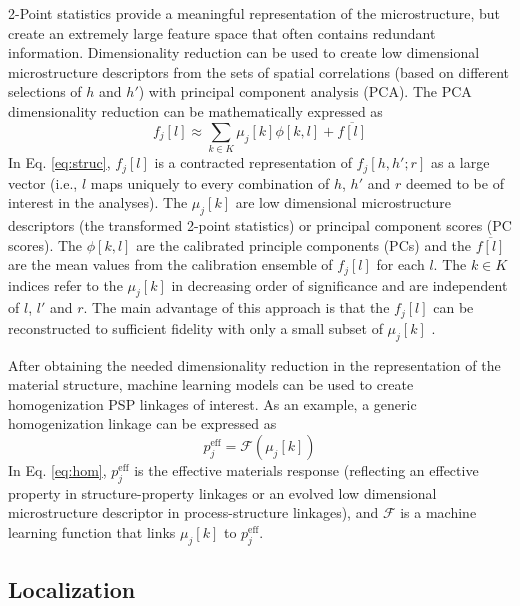 \documentclass{bmcart}
\begin{document}
2-Point statistics provide a meaningful representation of the
microstructure, but create an extremely large feature space that often
contains redundant information. Dimensionality reduction can be used
to create low dimensional microstructure descriptors from the sets of
spatial correlations (based on different selections of $h$ and $h'$)
with principal component analysis (PCA). The PCA dimensionality
reduction can be mathematically expressed as
\begin{equation} \label{eq:struc}
    f_j\left[l\right] \approx \sum_{k\in K} \mu_j\left[k\right]
    \phi\left[k,l\right] + \overline{f[l]}
\end{equation}
In Eq. \ref{eq:struc}, $f_j\left[l\right]$ is a contracted representation of 
$f_j\left[h, h'; r\right]$ %
as a large vector (i.e., $l$ maps uniquely to every combination
of $h$, $h'$ and $r$ deemed to be of interest in the analyses). The $\mu_j[k]$ are low dimensional microstructure
descriptors (the transformed 2-point statistics) or principal component
scores (PC scores). The $\phi\left[k, l\right]$ are the calibrated
principle components (PCs) and the $\overline{f[l]}$ are the mean
values  from the calibration ensemble of $f_j\left[l\right]$ for each
$l$. The $k \in K$ indices refer to the $\mu_j\left[k\right]$ in
decreasing order of significance and are independent of $l$, $l'$ and
$r$. The main advantage of this approach is that the
$f_j\left[l\right]$ can be reconstructed to sufficient fidelity with
only a small subset of $\mu_j\left[k\right]$
\cite{hotelling1933analysis}.

After obtaining the needed dimensionality reduction in the
representation of the material structure, machine learning models can
be used to create homogenization PSP linkages of interest.
As an example, a generic homogenization linkage can be expressed as
\begin{equation} \label{eq:hom}
    p_j^{\text{eff}} = \mathcal{F}(\mu_j[k])
\end{equation}
In Eq. \ref{eq:hom}, $p_j^{\text{eff}}$ is the effective materials
response (reflecting an effective property in structure-property
linkages or an evolved low dimensional microstructure descriptor in
process-structure linkages), and $\mathcal{F}$ is a machine learning
function that links $\mu_j[k]$ to $p_j^{\text{eff}}$.

\subsection{Localization}
\end{document}
